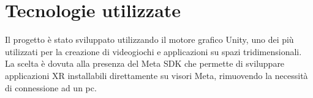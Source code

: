 \section{Tecnologie utilizzate}
\label{sec:introduzione_tecnologie_utilizzate}

Il progetto è stato sviluppato utilizzando il motore grafico Unity, uno dei più utilizzati
per la creazione di videogiochi e applicazioni su spazi tridimensionali. La
scelta è dovuta alla presenza del Meta SDK che permette di sviluppare
applicazioni XR installabili direttamente su visori Meta, rimuovendo la necessità
di connessione ad un pc.
